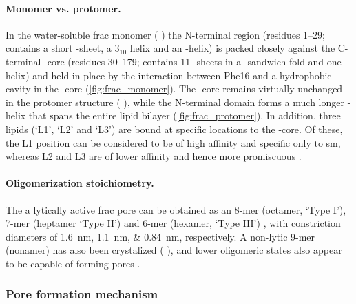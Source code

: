 \paragraph{Monomer vs. protomer.}
%
In the water-soluble \gls{frac} monomer ( \cite{Tanaka-2015}) the N-terminal region (residues
1--29; contains a short \tb-sheet, a 3$_10$ helix and an \ta-helix) is packed closely against the C-terminal
\tb-core (residues 30--179; contains 11 \tb-sheets in a \tb-sandwich fold and one \ta-helix) and held in place
by the interaction between Phe16 and a hydrophobic cavity in the \tb-core (\cref{fig:frac_monomer}). The
\tb-core remains virtually unchanged in the protomer structure ( \cite{Tanaka-2015}), while the
N-terminal domain forms a much longer \ta-helix that spans the entire lipid bilayer
(\cref{fig:frac_protomer}). In addition, three lipids (`L1', `L2' and `L3') are bound at specific locations to
the \tb-core. Of these, the L1 position can be considered to be of high affinity and specific only to
\gls{sm}, whereas L2 and L3 are of lower affinity and hence more promiscuous \cite{Tanaka-2015}. 

\paragraph{Oligomerization stoichiometry.}
%
The a lytically active \gls{frac} pore can be obtained as an 8-mer (octamer, `Type I'), 7-mer (heptamer `Type
II') and 6-mer (hexamer, `Type III') \cite{Huang-2019}, with constriction diameters of
\SIlist{1.6;1.1;0.84}{\nm}, respectively. A non-lytic 9-mer (nonamer) has also been crystalized (
\cite{Mechaly-2011}), and lower oligomeric states also appear to be capable of forming pores
\cite{Rojka-2016}.

\subsubsection{Pore formation mechanism}

